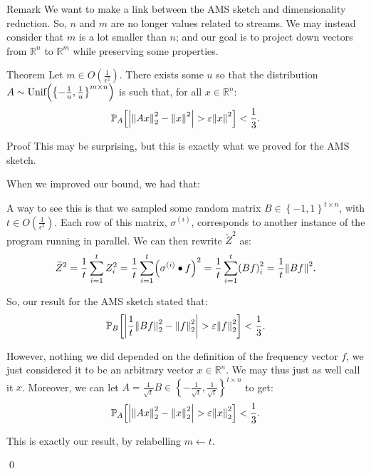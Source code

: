 \documentclass[a4paper]{article}
\begin{document}
\begin{parag}{Remark}
    We want to make a link between the AMS sketch and dimensionality reduction. So, $n$ and $m$ are no longer values related to streams. We may instead consider that $m$ is a lot smaller than $n$; and our goal is to project down vectors from $\mathbb{R}^n$ to $\mathbb{R}^m$ while preserving some properties.
\end{parag}

\begin{parag}{Theorem}
    Let $m \in O\left(\frac{1}{\epsilon^2}\right)$. There exists some $u$ so that the distribution $A \followsdistr \text{Unif}\left(\left\{-\frac{1}{u}, \frac{1}{u}\right\}^{m \times n}\right)$ is such that, for all $x \in \mathbb{R}^n$: 
    \[\prob_{A}\left[\left|\left\|A x\right\|_2^2 - \left\|x\right\|^2\right| > \epsilon \left\|x\right\|^2\right] < \frac{1}{3}.\]
    
    \begin{subparag}{Proof}
        This may be surprising, but this is exactly what we proved for the AMS sketch.

        When we improved our bound, we had that:

        A way to see this is that we sampled some random matrix $B \in \left\{-1, 1\right\}^{t \times n}$, with $t \in O\left(\frac{1}{\epsilon^2}\right)$. Each row of this matrix, $\sigma^{\left(i\right)}$, corresponds to another instance of the program running in parallel. We can then rewrite $\widetilde{Z}^2$ as:
        \[\widetilde{Z}^2 = \frac{1}{t} \sum_{i=1}^{t} Z_i^2 = \frac{1}{t} \sum_{i=1}^{t} \left(\sigma^{\left(i\right)} \dotprod f\right)^2 = \frac{1}{t} \sum_{i=1}^{t} \left(B f\right)_i^2 = \frac{1}{t} \left\|B f\right\|^2.\]

        So, our result for the AMS sketch stated that:
        \[\prob_{B}\left[\left|\frac{1}{t} \left\|B f\right\|_2^2 - \left\|f\right\|_2^2\right| > \epsilon \left\|f\right\|_2^2\right] < \frac{1}{3}.\]

        However, nothing we did depended on the definition of the frequency vector $f$, we just considered it to be an arbitrary vector $x \in \mathbb{R}^n$. We may thus just as well call it $x$. Moreover, we can let $A = \frac{1}{\sqrt{t}} B \in \left\{-\frac{1}{\sqrt{t}}, \frac{1}{\sqrt{t}}\right\}^{t \times n}$ to get: 
        \[\prob_{A}\left[\left|\left\|A x\right\|_2^2 - \left\|x\right\|_2^2\right| > \epsilon \left\|x\right\|_2^2\right] < \frac{1}{3}.\]

        This is exactly our result, by relabelling $m \leftarrow t$.

        \qed
    \end{subparag}
\end{parag}
\end{document}
